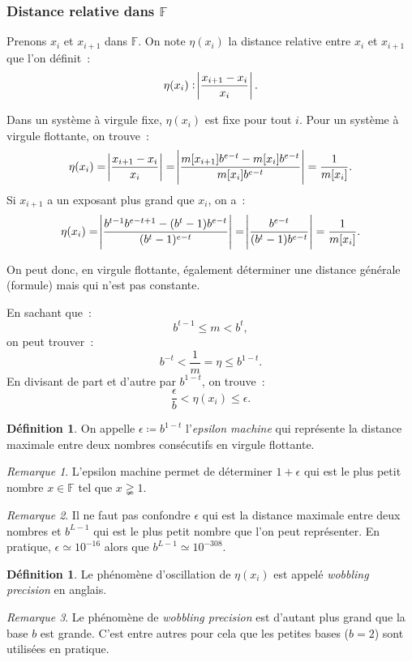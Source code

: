 \documentclass{article}
\theoremstyle{definition}
\newtheorem{déf}[thm]{Définition}
\theoremstyle{remark}
\newtheorem*{rmq}{Remarque}
\newcommand{\F}{\mathbb F}
\begin{document}
		\subsubsection{Distance relative dans $\F$}
		Prenons $x_i$ et $x_{i+1}$ dans $\F$. On note $\eta(x_i)$ la distance relative entre $x_i$ et $x_{i+1}$ que l'on définit~:
		\[\eta(x_i) : \abs {\frac {x_{i+1}-x_i}{x_i}}.\]

		Dans un système à virgule fixe, $\eta(x_i)$ est fixe pour tout $i$. Pour un système à virgule flottante, on trouve~:
		\[\eta(x_i) = \abs {\frac {x_{i+1}-x_i}{x_i}} = \abs {\frac {m[x_{i+1}]b^{e-t}-m[x_i]b^{e-t}}{m[x_i]b^{e-t}}} = \frac 1{m[x_i]}.\]
		Si $x_{i+1}$ a un exposant plus grand que $x_i$, on a~:
		\[\eta(x_i)=  \abs {\frac {b^{t-1}b^{e-t+1} - (b^t-1)b^{e-t}}{(b^t-1)^{e-t}}} = \abs {\frac{b^{e-t}}{(b^t-1)b^{e-t}}} = \frac 1{m[x_i]}.\]

		On peut donc, en virgule flottante, également déterminer une distance générale (formule) mais qui n'est pas constante.

		En sachant que~:
		\[b^{t-1} \leq m < b^t,\]
		on peut trouver~:
		\[b^{-t} < \frac 1m = \eta \leq b^{1-t}.\]
		En divisant de part et d'autre par $b^{1-t}$, on trouve~:
		\[\frac \epsilon b < \eta(x_i) \leq \epsilon.\]

		\begin{déf} On appelle $\epsilon \coloneqq b^{1-t}$ l'\emph{epsilon machine} qui représente la distance maximale entre deux nombres consécutifs en
		virgule flottante.
		\end{déf}

		\begin{rmq} L'epsilon machine permet de déterminer $1+\epsilon$ qui est le plus petit nombre $x \in \F$ tel que $x \gneqq 1$. \end{rmq}

		\begin{rmq} Il ne faut pas confondre $\epsilon$ qui est la distance maximale entre deux nombres et $b^{L-1}$ qui est le plus petit nombre que l'on peut
		représenter. En pratique, $\epsilon \simeq 10^{-16}$ alors que $b^{L-1} \simeq 10^{-308}$. \end{rmq}

		\begin{déf} Le phénomène d'oscillation de $\eta(x_i)$ est appelé \textit{wobbling precision} en anglais. \end{déf}

		\begin{rmq} Le phénomène de \textit{wobbling precision} est d'autant plus grand que la base $b$ est grande. C'est entre autres pour cela que les petites
		bases ($b = 2$) sont utilisées en pratique. \end{rmq}
\end{document}

